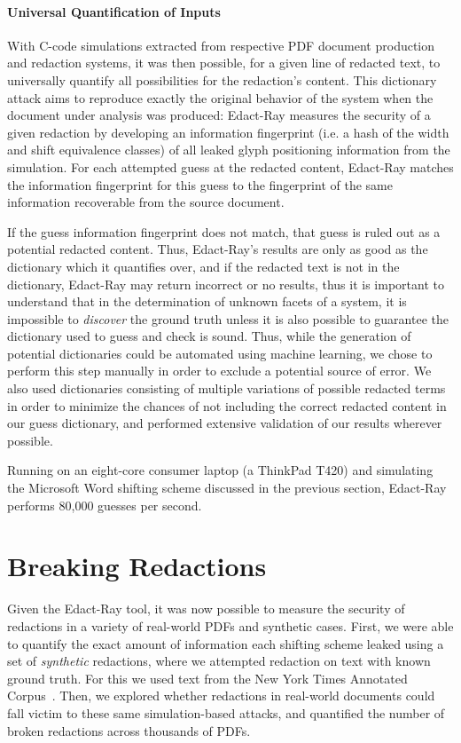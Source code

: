\paragraph{Universal Quantification of Inputs}
With C-code simulations extracted from respective PDF document production and redaction systems, it was then possible, for a given line of redacted text, to universally quantify all possibilities for the redaction's content.
This dictionary attack aims to reproduce exactly the original behavior of the system when the document under analysis was produced: Edact-Ray measures the security of a given redaction by developing an information fingerprint (i.e. a hash of the width and shift equivalence classes) of all leaked glyph positioning information from the simulation.
For each attempted guess at the redacted content, Edact-Ray matches the information fingerprint for this guess to the fingerprint of the same information recoverable from the source document.

If the guess information fingerprint does not match, that guess is ruled out as a potential redacted content. 
Thus, Edact-Ray's results are only as good as the dictionary which it quantifies over, and if the redacted text is not in the dictionary, Edact-Ray may return incorrect or no results, thus it is important to understand that in the determination of unknown facets of a system, it is impossible to \emph{discover} the ground truth unless it is also possible to guarantee the dictionary used to guess and check is sound.
Thus, while the generation of potential dictionaries could be automated using machine learning, we chose to perform this step manually in order to exclude a potential source of error.
We also used dictionaries consisting of multiple variations of possible redacted terms in order to minimize the chances of not including the correct redacted content in our guess dictionary, and performed extensive validation of our results wherever possible.

Running on an eight-core consumer laptop (a ThinkPad T420) and simulating the Microsoft Word shifting scheme discussed in the previous section, Edact-Ray performs 80,000 guesses per second.

\section{Breaking Redactions}
\label{sec:redaction-attack}

Given the Edact-Ray tool, it was now possible to measure the security of redactions in a variety of real-world PDFs and synthetic cases.
First, we were able to quantify the exact amount of information each shifting scheme leaked using a set of \emph{synthetic} redactions, where we attempted redaction on text with known ground truth.
For this we used text from the New York Times Annotated Corpus~\cite{nytCorp}.
Then, we explored whether redactions in real-world documents could fall victim to these same simulation-based attacks, and quantified the number of broken redactions across thousands of PDFs.

